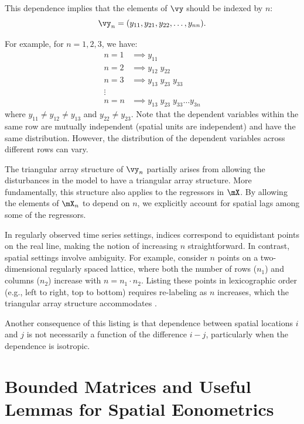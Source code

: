 \documentclass[english,12pt]{book}\usepackage[]{graphicx}\usepackage[]{xcolor}
\begin{document}
This dependence implies that the elements of $\vy$ should be indexed by $n$:
\begin{equation*}
  \vy_n = (y_{11}, y_{21}, y_{22}, \ldots, y_{nn}). 
\end{equation*}

For example, for $n = 1, 2, 3$, we have:
\begin{equation*}
\begin{aligned}
  n = 1 & \implies y_{11} \;         \\
  n = 2 & \implies y_{12} \; y_{22}  \\
  n = 3 & \implies y_{13} \; y_{23} \; y_{33} \\
  \vdots & \\
  n = n & \implies y_{13} \; y_{23} \; y_{33} \hdots y_{3n}
\end{aligned}
\end{equation*}
%
where $y_{11} \neq y_{12} \neq y_{13}$ and $y_{22}\neq y_{23}$. Note that the dependent variables within the same row are mutually independent (spatial units are independent) and have the same distribution. However, the distribution of the dependent variables across different rows can vary. 

The triangular array structure of $\vy_n$ partially arises from allowing the disturbances in the model to have a triangular array structure. More fundamentally, this structure also applies to the regressors in  $\mX$.  By allowing the elements of $\mX_n$ to depend on $n$, we explicitly account for spatial lags among some of the regressors.

In regularly observed time series settings, indices correspond to equidistant points on the real line, making the notion of increasing $n$ straightforward. In contrast, spatial settings involve ambiguity. For example, consider $n$ points on a two-dimensional regularly spaced lattice, where both the number of rows ($n_1$) and columns ($n_2$) increase with $n=n_1\cdot n_2$. Listing these points in lexicographic order (e.g., left to right, top to bottom) requires re-labeling as $n$ increases, which the triangular array structure accommodates \citep{anselin2021spatial}.

Another consequence of this listing is that dependence between spatial locations $i$ and $j$ is not necessarily a function of the difference $i-j$, particularly when the dependence is isotropic.

\section{Bounded Matrices and Useful Lemmas for Spatial Eonometrics}\label{sec:bounded-matrices}
\end{document}
